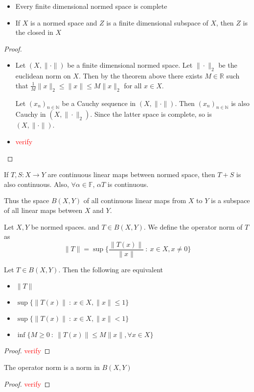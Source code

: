 
\begin{corollary}
  \begin{itemize}
    \item Every finite dimensional normed space is complete
    \item If $X$ is a normed space and $Z$ is a finite dimensional
      subspace of $X$, then $Z$ is the closed in $X$
  \end{itemize}
\end{corollary}
\begin{proof}
  \begin{itemize}
    \item Let $(X, \|\cdot\|)$ be a finite dimensional normed space.
      Let $\|\cdot\|_2$ be the euclidean norm on $X$. Then by the
      theorem above there exists $M \in \mathbb{R}$ such that
      $\frac{1}{M}\|x\|_2 \le \|x\| \le M \|x\|_2 $ for all $x \in X$.

      Let  $(x_n)_{n \in \mathbb{N}}$ be a Cauchy sequence in $(X,
      \|\cdot\|)$. Then $(x_n)_{ n \in \mathbb{N}} $ is also Cauchy
      in $(X, \|\cdot\|_2)$. Since the latter space is complete, so
      is $(X, \|\cdot\|)$.
    \item \textcolor{red}{verify}
  \end{itemize}
\end{proof}
\begin{note}
  If $T, S : X \to Y$ are continuous linear maps between normed
  space, then $T+S$ is also continuous. Also, $\forall \alpha \in
  \mathbb{F}$, $\alpha T$ is continuous.

  Thus the space $B(X, Y)$ of all continuous linear maps from $X$ to
  $Y$ is a subspace of all linear maps between $X$ and $Y$.
\end{note}

\begin{definition}
  Let $X, Y$ be normed spaces. and $T \in B(X, Y)$. We define the
  operator norm of $T$ as \[
    \|T\| = \sup \Big \{ \frac{\|T(x)\|}{\|x\|} \ : \ x \in X, x \neq 0 \Big \}
  \]
\end{definition}

\begin{lemma}
  Let $T \in B(X, Y)$. Then the following are equivalent
  \begin{itemize}
    \item $\|T\|$
    \item $\sup \{ \|T(x)\| \ : \ x \in X , \|x\| \le 1 \}$
    \item $\sup \{ \|T(x)\| \ : \ x \in X , \|x\| < 1 \}$
    \item $\inf \{ M \ge 0 \ : \ \|T(x)\| \le M \|x\|, \forall x \in X \}$
  \end{itemize}
\end{lemma}
\begin{proof}
  \textcolor{red}{verify}
\end{proof}

\begin{proposition}
  The operator norm is a norm in $B(X, Y)$
\end{proposition}
\begin{proof}
  \textcolor{red}{verify}
\end{proof}
